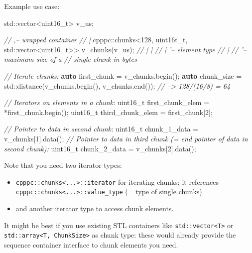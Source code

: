 \documentclass[]{article}
\newenvironment{Shaded}{}{}
\newcommand{\KeywordTok}[1]{\textcolor[rgb]{0.00,0.44,0.13}{\textbf{{#1}}}}
\newcommand{\DataTypeTok}[1]{\textcolor[rgb]{0.56,0.13,0.00}{{#1}}}
\newcommand{\DecValTok}[1]{\textcolor[rgb]{0.25,0.63,0.44}{{#1}}}
\newcommand{\CommentTok}[1]{\textcolor[rgb]{0.38,0.63,0.69}{\textit{{#1}}}}
\newcommand{\NormalTok}[1]{{#1}}
\providecommand{\tightlist}{%
  \setlength{\itemsep}{0pt}\setlength{\parskip}{0pt}}
\begin{document}
Example use case:

\begin{Shaded}
\begin{Highlighting}[]
\NormalTok{std::vector<}\DataTypeTok{uint16_t}\NormalTok{> v_us;}

\CommentTok{//                                    ,-- wrapped container}
\CommentTok{//                                    |}
\NormalTok{cpppc::chunks<}\DecValTok{128}\NormalTok{, uint16t_t, std::vector<}\DataTypeTok{uint16_t}\NormalTok{>> v_chunks(v_us);}
\CommentTok{//             |      |}
\CommentTok{//             |      '-- element type}
\CommentTok{//             |}
\CommentTok{//             '-- maximum size of a}
\CommentTok{//                 single chunk in bytes}

\CommentTok{// Iterate chunks:}
\KeywordTok{auto} \NormalTok{first_chunk = v_chunks.begin();}
\KeywordTok{auto} \NormalTok{chunk_size  = std::distance(v_chunks.begin(), v_chunks.end());}
                   \CommentTok{// --> 128/(16/8) = 64}

\CommentTok{// Iterators on elements in a chunk:}
\DataTypeTok{uint16_t} \NormalTok{first_chunk_elem = *first_chunk.begin();}
\DataTypeTok{uint16_t} \NormalTok{third_chunk_elem = first_chunk[}\DecValTok{2}\NormalTok{];}

\CommentTok{// Pointer to data in second chunk:}
\DataTypeTok{uint16_t} \NormalTok{chunk_1_data = v_chunks[}\DecValTok{1}\NormalTok{].data();}
\CommentTok{// Pointer to data in third chunk (= end pointer of data in second chunk):}
\DataTypeTok{uint16_t} \NormalTok{chunk_2_data = v_chunks[}\DecValTok{2}\NormalTok{].data();}
\end{Highlighting}
\end{Shaded}

Note that you need two iterator types:

\begin{itemize}
\tightlist
\item
  \texttt{cpppc::chunks\textless{}...\textgreater{}::iterator} for
  iterating chunks; it references
  \texttt{cpppc::chunks\textless{}...\textgreater{}::value\_type} (=
  type of single chunks)
\item
  and another iterator type to access chunk elements.
\end{itemize}

It might be best if you use existing STL containers like
\texttt{std::vector\textless{}T\textgreater{}} or
\texttt{std::array\textless{}T,\ ChunkSize\textgreater{}} as chunk type:
these would already provide the sequence container interface to chunk
elements you need.
\end{document}
